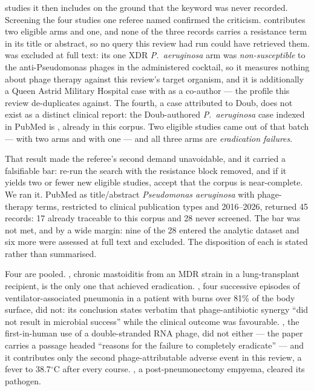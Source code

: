 studies it then includes on the ground that the keyword was never recorded. Screening the four studies one referee named confirmed the criticism. \textcite{Zaldastanishvili2021_viruses} contributes two eligible arms and \textcite{Green2023_cid} one, and none of the three records carries a resistance term in its title or abstract, so no query this review had run could have retrieved them. \textcite{Onsea2019_viruses} was excluded at full text: its one XDR \textit{P.\ aeruginosa} arm was \emph{non-susceptible} to the anti-Pseudomonas phages in the administered cocktail, so it measures nothing about phage therapy against this review's target organism, and it is additionally a Queen Astrid Military Hospital case with \citeauthor{Pirnay2024_natmicrobiol} as a co-author --- the profile this review de-duplicates against. The fourth, a case attributed to Doub, does not exist as a distinct clinical report: the Doub-authored \textit{P.\ aeruginosa} case indexed in PubMed is \textcite{Arya2026_pji_natcomms}, already in this corpus. Two eligible studies came out of that batch --- \textcite{Zaldastanishvili2021_viruses} with two arms and \textcite{Green2023_cid} with one --- and all three arms are \emph{eradication failures}.

That result made the referee's second demand unavoidable, and it carried a falsifiable bar: re-run the search with the resistance block removed, and if it yields two or fewer new eligible studies, accept that the corpus is near-complete. We ran it. PubMed as title/abstract \textit{Pseudomonas aeruginosa} with phage-therapy terms, restricted to clinical publication types and 2016--2026, returned 45 records: 17 already traceable to this corpus and 28 never screened. The bar was not met, and by a wide margin: nine of the 28 entered the analytic dataset and six more were assessed at full text and excluded. The disposition of each is stated rather than summarised.

Four are pooled. \textcite{Casazza2025_otolneurotol}, chronic mastoiditis from an MDR strain in a lung-transplant recipient, is the only one that achieved eradication. \textcite{Teney2024_viruses}, four successive episodes of ventilator-associated pneumonia in a patient with burns over 81\% of the body surface, did not: its conclusion states verbatim that phage-antibiotic synergy ``did not result in microbial success'' while the clinical outcome was favourable. \textcite{Li2023_microbiotechnol}, the first-in-human use of a double-stranded RNA phage, did not either --- the paper carries a passage headed ``reasons for the failure to completely eradicate'' --- and it contributes only the second phage-attributable adverse event in this review, a fever to 38.7$^{\circ}$C after every course. \textcite{Chen2022_bst}, a post-pneumonectomy empyema, cleared its pathogen.

